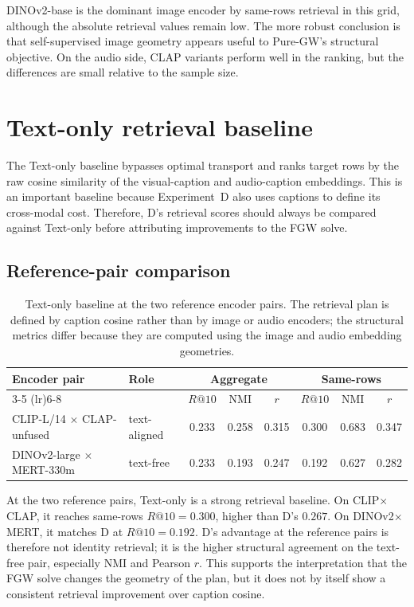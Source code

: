 DINOv2-base is the dominant image encoder by same-rows retrieval in
this grid, although the absolute retrieval values remain low. The
more robust conclusion is that self-supervised image geometry appears
useful to Pure-GW's structural objective. On the audio side, CLAP
variants perform well in the ranking, but the differences are small
relative to the sample size.


\section{Text-only retrieval baseline}
\label{sec:res-text}

The Text-only baseline bypasses optimal transport and ranks target rows
by the raw cosine similarity of the visual-caption and audio-caption
embeddings. This is an important baseline because Experiment~D also
uses captions to define its cross-modal cost. Therefore, D's retrieval
scores should always be compared against Text-only before attributing
improvements to the FGW solve.

\subsection{Reference-pair comparison}


\begin{table}[!ht]
\centering
\small
\setlength{\tabcolsep}{5pt}
\begin{tabular}{l l ccc ccc}
\toprule
Encoder pair & Role & \multicolumn{3}{c}{Aggregate} & \multicolumn{3}{c}{Same-rows} \\
        \cmidrule(lr){3-5} \cmidrule(lr){6-8}
 &  & $R@10$ & NMI & $r$ & $R@10$ & NMI & $r$ \\
\midrule
CLIP-L/14 $\times$ CLAP-unfused & text-aligned & 0.233 & 0.258 & 0.315 & 0.300 & 0.683 & 0.347 \\
DINOv2-large $\times$ MERT-330m & text-free & 0.233 & 0.193 & 0.247 & 0.192 & 0.627 & 0.282 \\
\bottomrule
\end{tabular}
\caption{Text-only baseline at the two reference encoder pairs. The retrieval plan is defined by caption cosine rather than by image or audio encoders; the structural metrics differ because they are computed using the image and audio embedding geometries.}
\label{tab:text-refpairs}
\end{table}

At the two reference pairs, Text-only is a strong retrieval baseline.
On CLIP$\times$CLAP, it reaches same-rows $R@10=0.300$, higher than D's
$0.267$. On DINOv2$\times$MERT, it matches D at $R@10=0.192$. D's
advantage at the reference pairs is therefore not identity retrieval;
it is the higher structural agreement on the text-free pair, especially
NMI and Pearson $r$. This supports the interpretation that the FGW
solve changes the geometry of the plan, but it does not by itself show
a consistent retrieval improvement over caption cosine.

